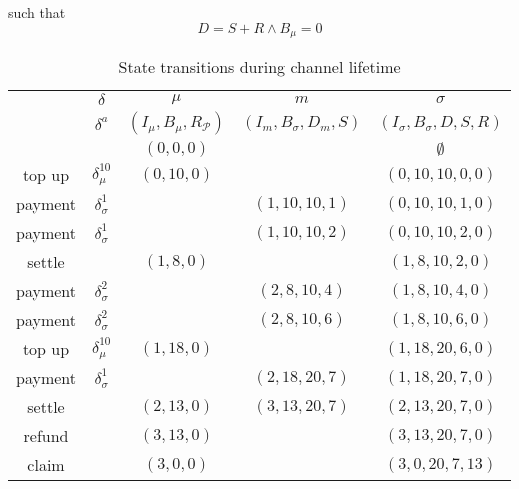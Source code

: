 \documentclass{llncs}
\begin{document}
such that
$$D = S + R \land B_\mu = 0$$

\begin{table}[t]
  \begin{tabularx}{\textwidth}{| S | S | C | C | C |}
       & $\delta$ & $\mu$ & $m$ & $\sigma$ \\ 
       & $\delta^a$ & $(I_\mu,B_\mu,R_\mathcal{P})$ & $(I_m,B_\sigma,D_m,S)$ & $(I_\sigma,B_\sigma,D,S,R)$ \\
  \hhline{~====}
       & & $(0,0,0)$ & & $\emptyset$ \\ 
      top up  & $\delta_\mu^{10}$   & $(0,10,0)$ &               & $(0,10,10,0,0)$ \\
      payment & $\delta_\sigma^1$ &            & $(1,10,10,1)$ & $(0,10,10,1,0)$ \\
      payment & $\delta_\sigma^1$ &            & $(1,10,10,2)$ & $(0,10,10,2,0)$ \\
      settle  &                    & $(1,8,0)$  &               & $(1,8,10,2,0)$ \\
      payment & $\delta_\sigma^2$ &            & $(2,8,10,4)$  & $(1,8,10,4,0)$ \\
      payment & $\delta_\sigma^2$ &            & $(2,8,10,6)$  & $(1,8,10,6,0)$ \\
      top up  & $\delta_\mu^{10}$   & $(1,18,0)$ &               & $(1,18,20,6,0)$ \\
      payment & $\delta_\sigma^1$ &            & $(2,18,20,7)$ & $(1,18,20,7,0)$ \\
      settle  &                    & $(2,13,0)$ & $(3,13,20,7)$ & $(2,13,20,7,0)$ \\
      refund  &                    & $(3,13,0)$ &               & $(3,13,20,7,0)$ \\
      claim   &                    & $(3,0,0)$  &               & $(3,0,20,7,13)$ \\
  \end{tabularx}
  \medskip
  \caption{State transitions during channel lifetime}
\end{table}
\end{document}
